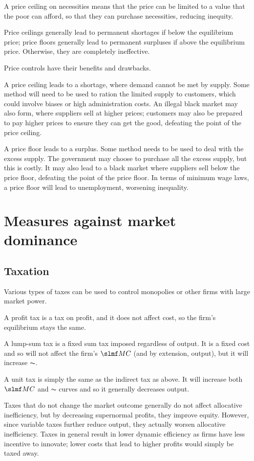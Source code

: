 \documentclass[Economics.tex]{subfiles}
\begin{document}
A price ceiling on necessities means that the price can be limited to a value that the poor can afford, so that they can purchase necessities, reducing inequity.

Price ceilings generally lead to permanent shortages if below the equilibrium price; price floors generally lead to permanent surpluses if above the equilibrium price. Otherwise, they are completely ineffective.

Price controls have their benefits and drawbacks.

A price ceiling leads to a shortage, where demand cannot be met by supply. Some method will need to be used to ration the limited supply to customers, which could involve biases or high administration costs. An illegal black market may also form, where suppliers sell at higher prices; customers may also be prepared to pay higher prices to ensure they can get the good, defeating the point of the price ceiling.

A price floor leads to a surplus. Some method needs to be used to deal with the excess supply. The government may choose to purchase all the excess supply, but this is costly. It may also lead to a black market where suppliers sell below the price floor, defeating the point of the price floor.
In terms of minimum wage laws, a price floor will lead to unemployment, worsening inequality.
\section{Measures against market dominance}
\subsection{Taxation}
Various types of taxes can be used to control monopolies or other firms with large market power.

A profit tax is a tax on profit, and it does not affect cost, so the firm's equilibrium stays the same.

A lump-sum tax is a fixed sum tax imposed regardless of output. It is a fixed cost and so will not affect the firm's \(\mrg{C}\) (and by extension, output), but it will increase \(\AC\).

A unit tax is simply the same as the indirect tax as above. It will increase both \(\mrg{C}\) and \(\AC\) curves and so it generally decreases output.

Taxes that do not change the market outcome generally do not affect allocative inefficiency, but by decreasing supernormal profits, they improve equity. However, since variable taxes further reduce output, they actually worsen allocative inefficiency. Taxes in general result in lower dynamic efficiency as firms have less incentive to innovate; lower costs that lead to higher profits would simply be taxed away.
\end{document}

